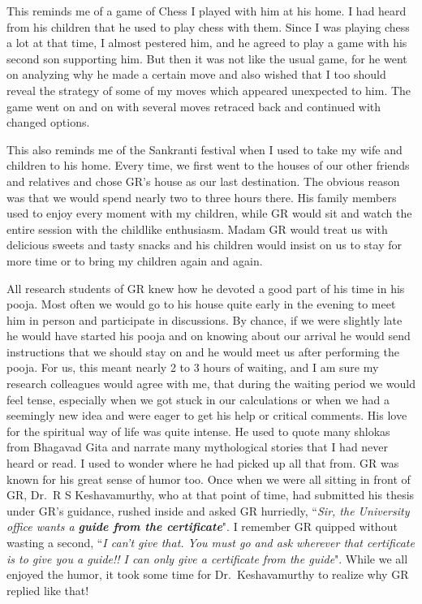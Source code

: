 This reminds me of a game of Chess I played with him at his home. I had heard from his children that he used to play chess with them. Since I was playing chess a lot at that time, I almost pestered him, and he agreed to play a game with his second son supporting him. But then it was not like the usual game, for he went on analyzing why he made a certain move and also wished that I too should reveal the strategy of some of my moves which appeared unexpected to him. The game went on and on with several moves retraced back and continued with changed options.

This also reminds me of the Sankranti festival when I used to take my wife and children to his home. Every time, we first went to the houses of our other friends and relatives and chose GR's house as our last destination. The obvious reason was that we would spend nearly two to three hours there. His family members used to enjoy every moment with my children, while GR would sit and watch the entire session with the childlike enthusiasm. Madam GR would treat us with delicious sweets and tasty snacks and his children would insist on us to stay for more time or to bring my children again and again.

All research students of GR knew how he devoted a good part of his time in his pooja. Most often we would go to his house quite early in the evening to meet him in person and participate in discussions. By chance, if we were slightly late he would have started his pooja and on knowing about our arrival he would send instructions that we should stay on and he would meet us after performing the pooja. For us, this meant nearly 2 to 3 hours of waiting, and I am sure my research colleagues would agree with me, that during the waiting period we would feel tense, especially when we got stuck in our calculations or when we had a seemingly new idea and were eager to get his help or critical comments. His love for the spiritual way of life was quite intense. He used to quote many shlokas from Bhagavad Gita and narrate many mythological stories that I had never heard or read. I used to wonder where he had picked up all that from. GR was known for his great sense of humor too. Once when we were all sitting in front of GR, Dr.\ R S Keshavamurthy, who at that point of time, had submitted his thesis under GR's guidance, rushed inside and asked GR hurriedly, ``\textit{Sir, the University office wants a \textbf{guide from the certificate}}". I remember GR quipped without wasting a second, ``\textit{I can't give that. You must go and ask wherever that certificate is to give you a guide!! I can only give a certificate from the guide}". While we all enjoyed the humor, it took some time for Dr.\ Keshavamurthy to realize why GR replied like that!

